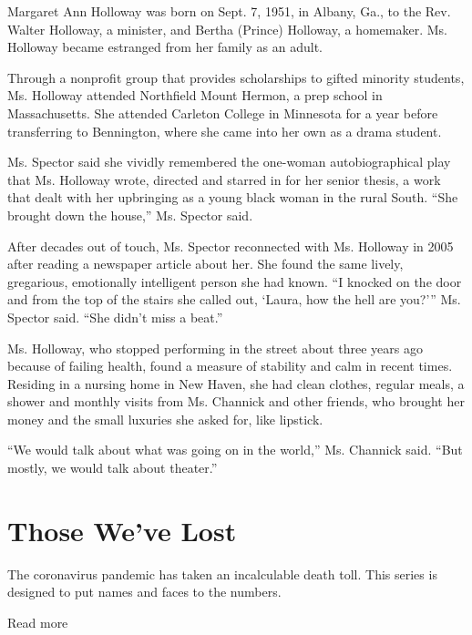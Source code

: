 Margaret Ann Holloway was born on Sept. 7, 1951, in Albany, Ga., to the
Rev. Walter Holloway, a minister, and Bertha (Prince) Holloway, a
homemaker. Ms. Holloway became estranged from her family as an adult.

Through a nonprofit group that provides scholarships to gifted minority
students, Ms. Holloway attended Northfield Mount Hermon, a prep school
in Massachusetts. She attended Carleton College in Minnesota for a year
before transferring to Bennington, where she came into her own as a
drama student.

Ms. Spector said she vividly remembered the one-woman autobiographical
play that Ms. Holloway wrote, directed and starred in for her senior
thesis, a work that dealt with her upbringing as a young black woman in
the rural South. ``She brought down the house,'' Ms. Spector said.

After decades out of touch, Ms. Spector reconnected with Ms. Holloway in
2005 after reading a newspaper article about her. She found the same
lively, gregarious, emotionally intelligent person she had known. ``I
knocked on the door and from the top of the stairs she called out,
`Laura, how the hell are you?''' Ms. Spector said. ``She didn't miss a
beat.''

Ms. Holloway, who stopped performing in the street about three years ago
because of failing health, found a measure of stability and calm in
recent times. Residing in a nursing home in New Haven, she had clean
clothes, regular meals, a shower and monthly visits from Ms. Channick
and other friends, who brought her money and the small luxuries she
asked for, like lipstick.

``We would talk about what was going on in the world,'' Ms. Channick
said. ``But mostly, we would talk about theater.''

\href{https://www.nytimes.com/interactive/2020/obituaries/people-died-coronavirus-obituaries.html?action=click\&pgtype=Article\&state=default\&region=BELOW_MAIN_CONTENT\&context=covid_obits_promo}{}

\hypertarget{those-weve-lost}{%
\section{Those We've Lost}\label{those-weve-lost}}

The coronavirus pandemic has taken an incalculable death toll. This
series is designed to put names and faces to the numbers.

Read more

